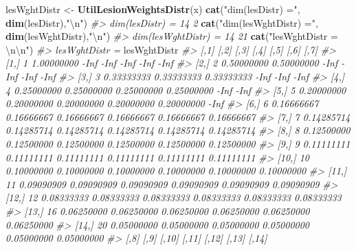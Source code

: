 \documentclass[
]{book}
\newenvironment{Shaded}{\begin{snugshade}}{\end{snugshade}}
\newcommand{\CharTok}[1]{\textcolor[rgb]{0.31,0.60,0.02}{#1}}
\newcommand{\CommentTok}[1]{\textcolor[rgb]{0.56,0.35,0.01}{\textit{#1}}}
\newcommand{\KeywordTok}[1]{\textcolor[rgb]{0.13,0.29,0.53}{\textbf{#1}}}
\newcommand{\NormalTok}[1]{#1}
\newcommand{\StringTok}[1]{\textcolor[rgb]{0.31,0.60,0.02}{#1}}
\begin{document}
\begin{Shaded}
\begin{Highlighting}[]
\NormalTok{lesWghtDistr \textless{}{-}}\StringTok{ }\KeywordTok{UtilLesionWeightsDistr}\NormalTok{(x)}
\KeywordTok{cat}\NormalTok{(}\StringTok{"dim(lesDistr) ="}\NormalTok{, }\KeywordTok{dim}\NormalTok{(lesDistr),}\StringTok{"}\CharTok{\textbackslash{}n}\StringTok{"}\NormalTok{)}
\CommentTok{\#\textgreater{} dim(lesDistr) = 14 2}
\KeywordTok{cat}\NormalTok{(}\StringTok{"dim(lesWghtDistr) ="}\NormalTok{, }\KeywordTok{dim}\NormalTok{(lesWghtDistr),}\StringTok{"}\CharTok{\textbackslash{}n}\StringTok{"}\NormalTok{)}
\CommentTok{\#\textgreater{} dim(lesWghtDistr) = 14 21}
\KeywordTok{cat}\NormalTok{(}\StringTok{"lesWghtDistr = }\CharTok{\textbackslash{}n\textbackslash{}n}\StringTok{"}\NormalTok{)}
\CommentTok{\#\textgreater{} lesWghtDistr =}
\NormalTok{lesWghtDistr}
\CommentTok{\#\textgreater{}       [,1]       [,2]       [,3]       [,4]       [,5]       [,6]       [,7]}
\CommentTok{\#\textgreater{}  [1,]    1 1.00000000       {-}Inf       {-}Inf       {-}Inf       {-}Inf       {-}Inf}
\CommentTok{\#\textgreater{}  [2,]    2 0.50000000 0.50000000       {-}Inf       {-}Inf       {-}Inf       {-}Inf}
\CommentTok{\#\textgreater{}  [3,]    3 0.33333333 0.33333333 0.33333333       {-}Inf       {-}Inf       {-}Inf}
\CommentTok{\#\textgreater{}  [4,]    4 0.25000000 0.25000000 0.25000000 0.25000000       {-}Inf       {-}Inf}
\CommentTok{\#\textgreater{}  [5,]    5 0.20000000 0.20000000 0.20000000 0.20000000 0.20000000       {-}Inf}
\CommentTok{\#\textgreater{}  [6,]    6 0.16666667 0.16666667 0.16666667 0.16666667 0.16666667 0.16666667}
\CommentTok{\#\textgreater{}  [7,]    7 0.14285714 0.14285714 0.14285714 0.14285714 0.14285714 0.14285714}
\CommentTok{\#\textgreater{}  [8,]    8 0.12500000 0.12500000 0.12500000 0.12500000 0.12500000 0.12500000}
\CommentTok{\#\textgreater{}  [9,]    9 0.11111111 0.11111111 0.11111111 0.11111111 0.11111111 0.11111111}
\CommentTok{\#\textgreater{} [10,]   10 0.10000000 0.10000000 0.10000000 0.10000000 0.10000000 0.10000000}
\CommentTok{\#\textgreater{} [11,]   11 0.09090909 0.09090909 0.09090909 0.09090909 0.09090909 0.09090909}
\CommentTok{\#\textgreater{} [12,]   12 0.08333333 0.08333333 0.08333333 0.08333333 0.08333333 0.08333333}
\CommentTok{\#\textgreater{} [13,]   16 0.06250000 0.06250000 0.06250000 0.06250000 0.06250000 0.06250000}
\CommentTok{\#\textgreater{} [14,]   20 0.05000000 0.05000000 0.05000000 0.05000000 0.05000000 0.05000000}
\CommentTok{\#\textgreater{}             [,8]       [,9]      [,10]      [,11]      [,12]      [,13]  [,14]}

\end{Highlighting}
\end{Shaded}
\end{document}
